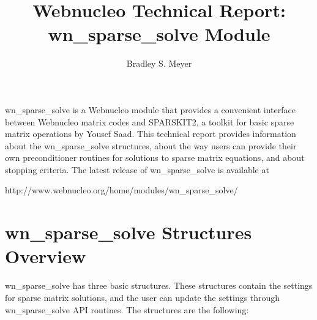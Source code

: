\documentclass{article}    %
\title{Webnucleo Technical Report: wn\_sparse\_solve Module}
\author{Bradley S. Meyer}
\begin{document}

\maketitle                 %

wn\_sparse\_solve is a Webnucleo module that provides a convenient interface
between Webnucleo matrix codes and SPARSKIT2, a toolkit for basic sparse
matrix operations by Yousef Saad.  This technical report provides information
about the wn\_sparse\_solve structures, about the way users can provide
their own preconditioner routines for solutions to sparse matrix equations,
and about stopping criteria.
The latest release of wn\_sparse\_solve is available at
\begin{center}
http://www.webnucleo.org/home/modules/wn\_sparse\_solve/
\end{center}

\section{wn\_sparse\_solve Structures Overview}  

wn\_sparse\_solve has three basic structures.  These structures contain the
settings for sparse matrix solutions, and the user can update the settings
through wn\_sparse\_solve API routines.  The structures are the following:
\end{document}
